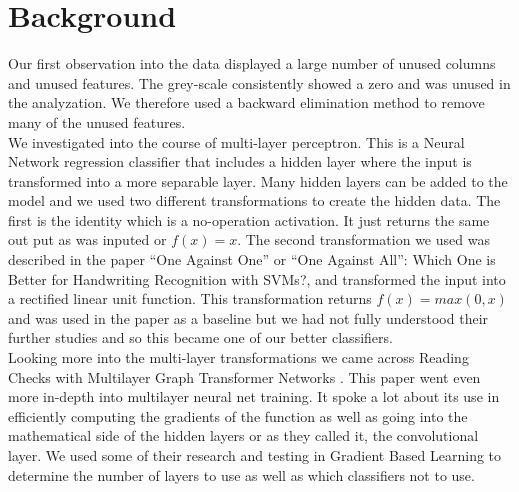 
\section{Background}
\label{sec:background}
Our first observation into the data displayed a large number of unused columns
and unused features. The grey-scale consistently showed a zero and was unused in
the analyzation. We therefore used a backward elimination method to remove many
of the unused features.\\

We investigated into the course of multi-layer perceptron. This is a
Neural Network regression classifier that includes a hidden layer
where the input is transformed into a more separable layer. Many
hidden layers can be added to the model and we used two different
transformations to create the hidden data. The first is the identity
which is a no-operation activation. It just returns the same out put
as was inputed or $f(x)=x$. The second transformation we used was
described in the paper “One Against One” or “One Against All”: Which One is
Better for Handwriting Recognition with SVMs?,
and transformed the input into a rectified linear unit function.\cite{milgram} This
transformation returns $f(x)=max(0,x)$ and was used in the paper as a
baseline but we had not fully understood their further studies and so
this became one of our better classifiers. \\

Looking more into the multi-layer transformations we came across
Reading Checks with Multilayer Graph Transformer Networks
\cite{cun}. This paper went even more in-depth into multilayer neural
net training. It spoke a lot about its use in efficiently computing
the gradients of the function as well as going into the mathematical
side of the hidden layers or as they called it, the convolutional
layer. We used some of their research and testing in Gradient Based
Learning to determine the number of layers to use as well as which
classifiers not to use. \\
